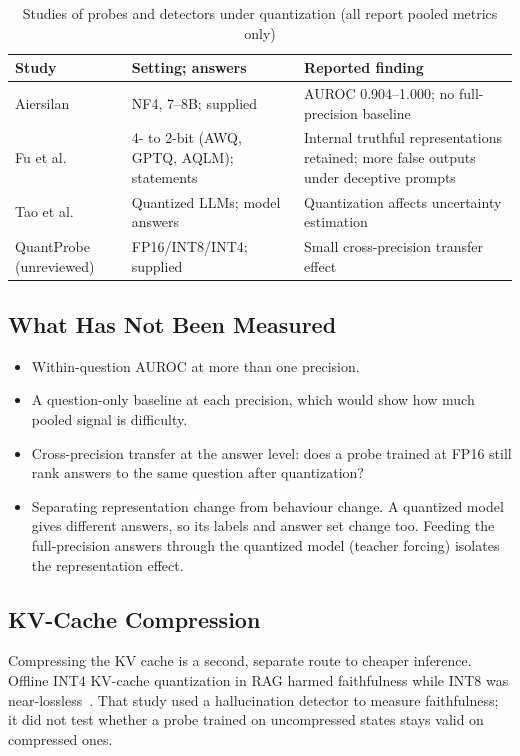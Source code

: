 \documentclass[conference]{IEEEtran}
\begin{document}
\begin{table}[!t]
\caption{Studies of probes and detectors under quantization (all report pooled metrics only)}
\label{tab:quant}
\footnotesize
\begin{tabularx}{\columnwidth}{@{}L{2.25cm}L{2.15cm}Y@{}}
\toprule
Study & Setting; answers & Reported finding \\
\midrule
Aiersilan~\cite{aiersilan2026quantized} & NF4, 7--8B; supplied & AUROC 0.904--1.000; no full-precision baseline \\
Fu et al.~\cite{truthfulnesseval2025} & 4- to 2-bit (AWQ, GPTQ, AQLM); statements & Internal truthful representations retained; more false outputs under deceptive prompts \\
Tao et al.~\cite{revisiting2025} & Quantized LLMs; model answers & Quantization affects uncertainty estimation \\
QuantProbe~\cite{quantprobe} (unreviewed) & FP16/\allowbreak INT8/\allowbreak INT4; supplied & Small cross-precision transfer effect \\
\bottomrule
\end{tabularx}
\end{table}

\subsection{What Has Not Been Measured}
\begin{itemize}
\item Within-question AUROC at more than one precision.
\item A question-only baseline at each precision, which would show how much pooled signal is difficulty.
\item Cross-precision transfer at the answer level: does a probe trained at FP16 still rank answers to the same question after quantization?
\item Separating representation change from behaviour change. A quantized model gives different answers, so its labels and answer set change too. Feeding the full-precision answers through the quantized model (teacher forcing) isolates the representation effect.
\end{itemize}

\subsection{KV-Cache Compression}
Compressing the KV cache is a second, separate route to cheaper inference. Offline INT4 KV-cache quantization in RAG harmed faithfulness while INT8 was near-lossless~\cite{faithfulness2026}. That study used a hallucination detector to measure faithfulness; it did not test whether a probe trained on uncompressed states stays valid on compressed ones.
\end{document}
